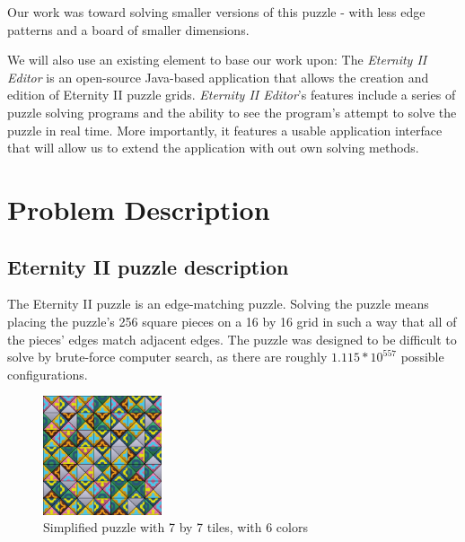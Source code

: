 \documentclass{llncs}
\begin{document}

Our work was toward solving smaller versions of this puzzle - with less edge patterns and a board of smaller dimensions.




We will also use an existing element to base our work upon: The \textit{Eternity II Editor} is an open-source Java-based application that allows the creation and edition of Eternity II puzzle grids. \textit{Eternity II Editor}'s features include a series of puzzle solving programs and the ability to see the program's attempt to solve the puzzle in real time. More importantly, it features a usable application interface that will allow us to extend the application with out own solving methods.

\section{Problem Description}\label{sec:problem_description}

\subsection{Eternity II puzzle description}\label{sec:puzzle_description}

The Eternity II puzzle is an edge-matching puzzle. Solving the puzzle means placing the puzzle's 256 square pieces on a 16 by 16  grid in such a way that all of the pieces' edges match adjacent edges. The puzzle was designed to be difficult to solve by brute-force computer search, as there are roughly $1.115 * 10 ^ {557}$ possible configurations.

\begin{figure}[h]
	\centering
	\includegraphics[width=35mm]{images/shuffled.png}
	\caption{Simplified puzzle with 7 by 7 tiles, with 6 colors}
	\label{fig:shuffled_example}
\end{figure}
\end{document}
